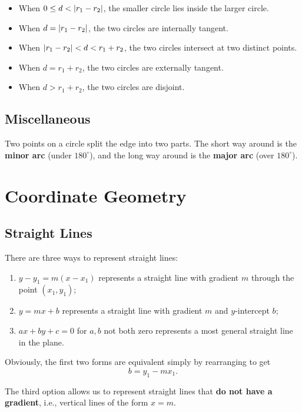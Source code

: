 \documentclass[11pt]{article}
\theoremstyle{definition}
\theoremstyle{remark}
\newcommand{\pqty}[1]{\left(#1\right)}
\DeclarePairedDelimiter{\abs}{\lvert}{\rvert}
\newcommand{\degree}{^{\circ}}
\begin{document}
\begin{itemize}
    \item When \(0 \leq d < \abs{r_1 - r_2}\), the smaller circle lies inside the larger circle.
    \item When \(d = \abs{r_1 - r_2}\), the two circles are internally tangent.
    \item When \(\abs{r_1 - r_2} < d < r_1 + r_2\), the two circles intersect at two distinct points.
    \item When \(d = r_1 + r_2\), the two circles are externally tangent.
    \item When \(d > r_1 + r_2\), the two circles are disjoint.
\end{itemize}

\subsection{Miscellaneous}\label{tmua-3-subsection-007}

Two points on a circle split the edge into two parts. The short way around is the \textbf{minor arc} (under \(180 \degree\)), and the long way around is the \textbf{major arc} (over \(180 \degree\)).

\section{Coordinate Geometry}\label{tmua-3-section-004}

\subsection{Straight Lines}\label{tmua-3-subsection-008}

There are three ways to represent straight lines:
\begin{enumerate}
    \item \(y - y_1 = m \pqty{x - x_1}\) represents a straight line with gradient \(m\) through the point \(\pqty{x_1, y_1}\);
    \item \(y = mx + b\) represents a straight line with gradient \(m\) and \(y\)-intercept \(b\);
    \item \(ax + by + c = 0\) for \(a, b\) not both zero represents a most general straight line in the plane.
\end{enumerate}

Obviously, the first two forms are equivalent simply by rearranging to get
\[
    b = y_1 - m x_1.
\]

The third option allows us to represent straight lines that \textbf{do not have a gradient}, i.e., vertical lines of the form \(x = m\).
\end{document}
